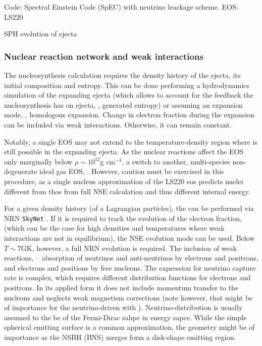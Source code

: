 Code: Spectral Einstein Code (SpEC) with neutrino leackage scheme. EOS: LS220

SPH evolution of ejecta

\subsubsection{Nuclear reaction network and weak interactions}

The nucleosynthesis calculation requires the density history of the ejecta, its initial composition and entropy. This can be done performing a hydrodynamics simulation of the expanding ejecta (which allows to account for the feedback the nucleosynthesis has on ejecta, \eg, generated entropy) or assuming an expansion mode, \eg, homologous expansion. Change in electron fraction during the expansion can be included via weak interactions. Otherwise, it can remain constant.

Notably, a single \ac{EOS} may not extend to the temperature-density region where \rproc{} is still possible in the expanding ejecta. As the nuclear reactions affect the \ac{EOS} only marginally below $\rho\sim 10^{12}$g cm$^{-3}$, a switch to another, multi-species non-degenerate ideal gas \ac{EOS}, \citep[\eg][]{Timmes:1999}. However, caution must be exercised in this procedure, as a single nucleus approximation of the LS220 eos predicts nuclei different from thos from full \ac{NSE} calculation and thus different internal energy. 

For a given density history (of a Lagrangian particles), the \nuc{} can be performed via \ac{NRN} \texttt{SkyNet} \citep{Lippuner:2015gwa}. If it is required to track the evolution of the electron fraction, (which can be the case for high densities and temperatures where weak interactions are not in equilibrium), the NSE evolution mode can be used. Below $T\sim 7$GK, however, a full \ac{NRN} evolution is required.
The inclusion of weak reactions, -- absorption of neutrinos and anti-neutrinos by electrons and positrons, and electrons and positions by free nucleons. The expression for neutrino capture rate is complex, which requires different distribution functions for electrons and positrons. In its applied form it does not include momentum transfer to the nucleons and neglects weak magnetism corrections (note however, that might be of importance for the neutrino-driven with \citep{Horowitz:2001xf}). Neutrino-distribution is usually assumed to the be of the Fermi-Dirac sahpe in energy sapce. While the simple spherical emitting surface is a common approximation, the geometry might be of importance as the \ac{NSBH} (\ac{BNS}) merges form a disk-shape emitting region.



